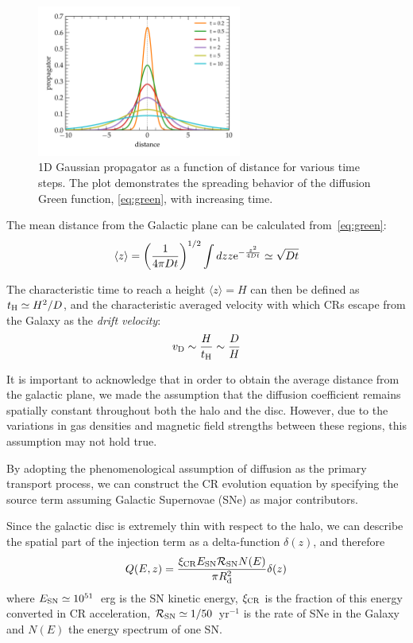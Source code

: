\begin{figure}[t]
\centering
\includegraphics[width=0.6\textwidth]{figures/gaussian_1D.pdf} 
\caption{1D Gaussian propagator as a function of distance for various time steps. The plot demonstrates the spreading behavior of the diffusion Green function, \cref{eq:green}, with increasing time.}
\label{fig:gaussian1d}
\end{figure}

The mean distance from the Galactic plane can be calculated from~\cref{eq:green}:
%
\begin{equation}
\langle z \rangle = \left(\frac{1}{{4 \pi D t}}\right)^{1/2} \int dz z {\rm e}^{-\frac{z^2}{4Dt}} \simeq \sqrt{Dt}
\end{equation}

The characteristic time to reach a height $\langle z \rangle = H$ can then be defined as  $t_{\rm H} \simeq H^2 / D$, and the characteristic averaged velocity with which CRs escape from the Galaxy as the \emph{drift velocity}:
%
\begin{equation}
v_{\rm D} \sim \frac{H}{t_{\rm H}} \sim \frac{D}{H}
\end{equation}

It is important to acknowledge that in order to obtain the average distance from the galactic plane, we made the assumption that the diffusion coefficient remains spatially constant throughout both the halo and the disc. However, due to the variations in gas densities and magnetic field strengths between these regions, this assumption may not hold true.

By adopting the phenomenological assumption of diffusion as the primary transport process, we can construct the CR evolution equation by specifying the source term assuming Galactic Supernovae (SNe) as major contributors.

Since the galactic disc is extremely thin with respect to the halo, we can describe the spatial part of the injection term as a delta-function $\delta(z)$, and therefore
%
\begin{equation}\label{eq:qprotons}
Q(E,z) = \frac{\xi_{\rm CR} E_{\rm SN} \mathcal R_{\rm SN} N(E)}{\pi R_{\rm d}^2} \delta(z) 
\end{equation}
%
where $E_{\rm SN} \simeq 10^{51}$~erg is the SN kinetic energy, $\xi_{\rm CR}$ is the fraction of this energy converted in CR acceleration, $\mathcal R_{\rm SN} \simeq 1 / 50$~yr$^{-1}$ is the rate of SNe in the Galaxy and $N(E)$ the energy spectrum of one SN. 

